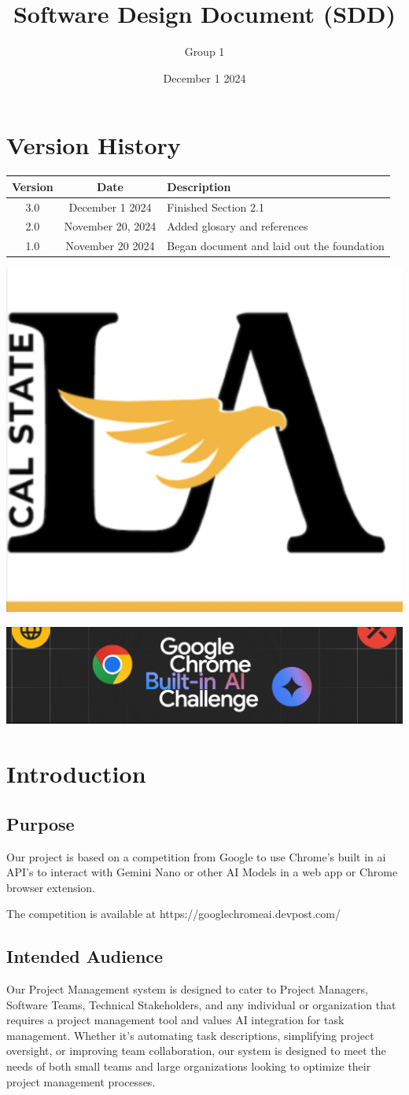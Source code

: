 \documentclass{article}
\title{Software Design Document (SDD)}
\author{Group 1 }
\date{December 1 2024}
\begin{document}
\maketitle  
\pagebreak

\tableofcontents
\pagebreak

\section*{Version History}
\begin{longtable}{|c|c|p{10cm}|}
\hline
\textbf{Version} & \textbf{Date} & \textbf{Description} \\ \hline
3.0 & December 1 2024 & Finished Section 2.1 \\ \hline
2.0 &November 20, 2024 & Added glosary and references \\ \hline
1.0 & November 20 2024 & Began document and laid out the foundation \\ \hline
\end{longtable}
\pagebreak

\includegraphics[width=0.3\linewidth]{../logo/csula.png} 

\includegraphics[width=0.3\linewidth]{../logo/chromeai.png} 
\section{Introduction}

\subsection{Purpose}
Our project is based on a competition from Google to use Chrome's built in \Gls{ai} API's to interact with Gemini Nano or other AI Models in a web app or Chrome browser extension. 

The competition is available at https://googlechromeai.devpost.com/

\subsection{Intended Audience}
Our Project Management system is designed to cater to Project Managers, Software Teams, Technical Stakeholders, and any individual or organization that requires a project management tool and values AI integration for task management. Whether it's automating task descriptions, simplifying project oversight, or improving team collaboration, our system is designed to meet the needs of both small teams and large organizations looking to optimize their project management processes.
\end{document}

